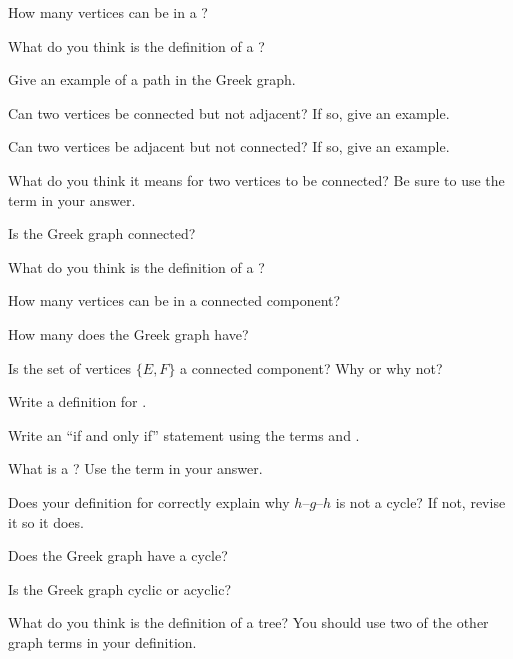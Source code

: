 \documentclass{tufte-handout}
\begin{document}
\begin{questions}
\item How many vertices can be in a ?
\item What do you think is the definition of a ?
\item Give an example of a path in the Greek graph.
\item Can two vertices be connected but not adjacent?  If so, give an
  example.
\item Can two vertices be adjacent but not connected?  If so, give an
  example.
\item What do you think it means for two vertices to be connected?  Be
  sure to use the term  in your answer.
\item Is the Greek graph connected?
\item What do you think is the definition of a ?
\item How many vertices can be in a connected component?
\item How many  does the Greek graph have?
\item Is the set of vertices $\{E, F\}$ a connected component?  Why or
  why not?
\item Write a definition for .
\item Write an ``if and only if'' statement using the terms
   and .
\item What is a ?  Use the term  in your
  answer.
\item Does your definition for  correctly explain why
  $h$--$g$--$h$ is not a cycle?  If not, revise it so it does.
\item Does the Greek graph have a cycle?
\item Is the Greek graph cyclic or acyclic?
\item What do you think is the definition of a tree?  You should use
  two of the other graph terms in your
  definition.
\end{questions}
\end{document}

